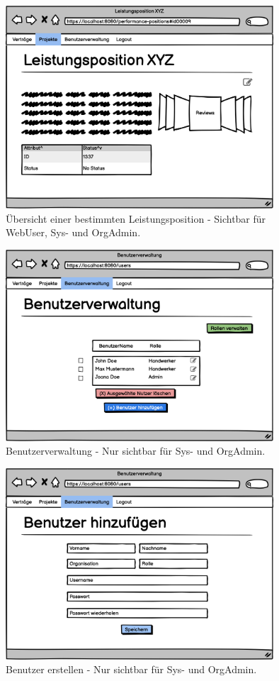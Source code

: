 \begin{figure}[h]
\centering
\includegraphics[width=10cm]{img/mockup_web/admin-und-benutzer-leistungsposition-exmpl.png}
\caption{Übersicht einer bestimmten Leistungsposition - Sichtbar für WebUser, Sys- und OrgAdmin.}
\end{figure}

\begin{figure}[h]
\centering
\includegraphics[width=10cm]{img/mockup_web/admin-und-benutzer-benutzerverwaltung.png}
\caption{Benutzerverwaltung - Nur sichtbar für Sys- und OrgAdmin.}
\end{figure}

\begin{figure}[h]
\centering
\includegraphics[width=10cm]{img/mockup_web/admin-und-benutzer-erstellen.png}
\caption{Benutzer erstellen - Nur sichtbar für Sys- und OrgAdmin.}
\end{figure}

